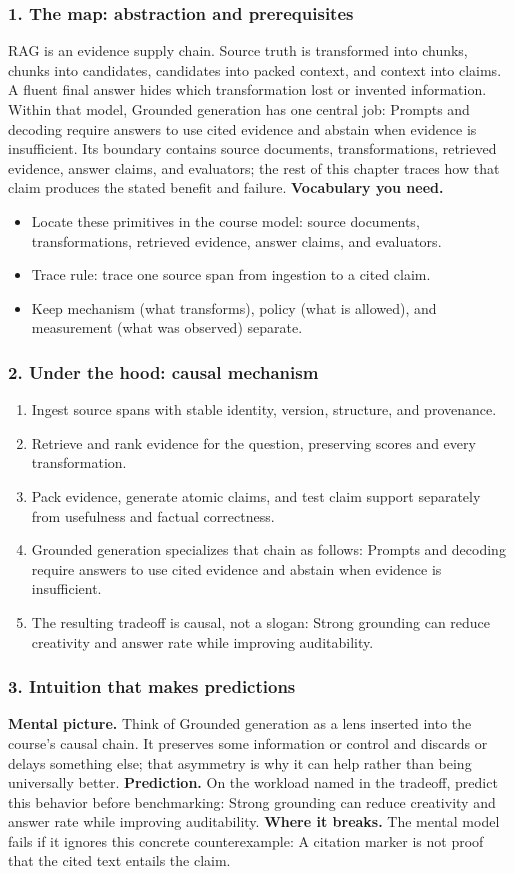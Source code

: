\subsubsection*{1. The map: abstraction and prerequisites}
RAG is an evidence supply chain. Source truth is transformed into chunks, chunks into candidates, candidates into packed context, and context into claims. A fluent final answer hides which transformation lost or invented information.
Within that model, Grounded generation has one central job: Prompts and decoding require answers to use cited evidence and abstain when evidence is insufficient. Its boundary contains source documents, transformations, retrieved evidence, answer claims, and evaluators; the rest of this chapter traces how that claim produces the stated benefit and failure.
\textbf{Vocabulary you need.}\begin{itemize}
\item Locate these primitives in the course model: source documents, transformations, retrieved evidence, answer claims, and evaluators.
\item Trace rule: trace one source span from ingestion to a cited claim.
\item Keep mechanism (what transforms), policy (what is allowed), and measurement (what was observed) separate.
\end{itemize}
\subsubsection*{2. Under the hood: causal mechanism}\begin{enumerate}
\item Ingest source spans with stable identity, version, structure, and provenance.
\item Retrieve and rank evidence for the question, preserving scores and every transformation.
\item Pack evidence, generate atomic claims, and test claim support separately from usefulness and factual correctness.
\item Grounded generation specializes that chain as follows: Prompts and decoding require answers to use cited evidence and abstain when evidence is insufficient.
\item The resulting tradeoff is causal, not a slogan: Strong grounding can reduce creativity and answer rate while improving auditability.
\end{enumerate}
\subsubsection*{3. Intuition that makes predictions}
\textbf{Mental picture.} Think of Grounded generation as a lens inserted into the course's causal chain. It preserves some information or control and discards or delays something else; that asymmetry is why it can help rather than being universally better.
\textbf{Prediction.} On the workload named in the tradeoff, predict this behavior before benchmarking: Strong grounding can reduce creativity and answer rate while improving auditability.
\textbf{Where it breaks.} The mental model fails if it ignores this concrete counterexample: A citation marker is not proof that the cited text entails the claim.
